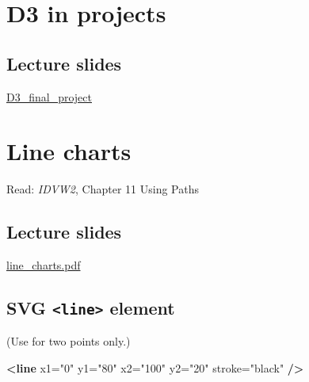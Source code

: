\documentclass[
  openany]{book}
\newenvironment{Shaded}{\begin{snugshade}}{\end{snugshade}}
\newcommand{\KeywordTok}[1]{\textcolor[rgb]{0.13,0.29,0.53}{\textbf{#1}}}
\newcommand{\OtherTok}[1]{\textcolor[rgb]{0.56,0.35,0.01}{#1}}
\newcommand{\StringTok}[1]{\textcolor[rgb]{0.31,0.60,0.02}{#1}}
\begin{document}
\hypertarget{d3-in-projects}{%
\chapter{\texorpdfstring{D3 in projects }{D3 in projects }}\label{d3-in-projects}}

\hypertarget{lecture-slides-5}{%
\section{\texorpdfstring{Lecture slides }{Lecture slides }}\label{lecture-slides-5}}

\href{pdfs/D3_final_project.pdf}{D3\_final\_project}

\hypertarget{line-charts}{%
\chapter{\texorpdfstring{Line charts }{Line charts }}\label{line-charts}}

Read: \emph{IDVW2}, Chapter 11 Using Paths

\hypertarget{lecture-slides-6}{%
\section{\texorpdfstring{Lecture slides }{Lecture slides }}\label{lecture-slides-6}}

\href{pdfs/line_charts.pdf}{line\_charts.pdf}

\hypertarget{svg-line-element}{%
\section{\texorpdfstring{SVG \texttt{\textless{}line\textgreater{}} element}{SVG \textless line\textgreater{} element}}\label{svg-line-element}}

(Use for two points only.)

\begin{Shaded}
\begin{Highlighting}[]
\KeywordTok{\textless{}line}\OtherTok{ x1=}\StringTok{"0"}\OtherTok{ y1=}\StringTok{"80"}\OtherTok{ x2=}\StringTok{"100"}\OtherTok{ y2=}\StringTok{"20"}\OtherTok{ stroke=}\StringTok{"black"} \KeywordTok{/\textgreater{}}
\end{Highlighting}
\end{Shaded}
\end{document}
